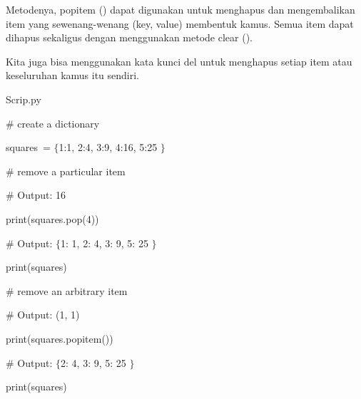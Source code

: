 Metodenya, popitem () dapat digunakan untuk menghapus dan mengembalikan item yang sewenang-wenang (key, value) membentuk kamus. Semua item dapat dihapus sekaligus dengan menggunakan metode clear (). \par
\noindent 
Kita juga bisa menggunakan kata kunci del untuk menghapus setiap item atau keseluruhan kamus itu sendiri. \par
\vspace{12pt}
\noindent 
Scrip.py \par
\vspace{12pt}
\noindent 
 \hspace*{0.5in}  $  \#  $ create a dictionary \par
\noindent 
 \hspace*{0.5in} squares~=  $  \{  $1:1, 2:4, 3:9, 4:16, 5:25 $  \}  $   \par
\vspace{12pt}
\noindent 
 \hspace*{0.5in}  $  \#  $ remove a particular item \par
\noindent 
 \hspace*{0.5in}  $  \#  $ Output: 16 \par
\noindent 
 \hspace*{0.5in} print(squares.pop(4))~  \par
\vspace{12pt}
\noindent 
 \hspace*{0.5in}  $  \#  $ Output:  $  \{  $1: 1, 2: 4, 3: 9, 5: 25 $  \}  $ \par
\noindent 
 \hspace*{0.5in} print(squares) \par
\vspace{12pt}
\noindent 
 \hspace*{0.5in}  $  \#  $ remove an arbitrary item \par
\noindent 
 \hspace*{0.5in}  $  \#  $ Output: (1, 1) \par
\noindent 
 \hspace*{0.5in} print(squares.popitem()) \par
\vspace{12pt}
\noindent 
 \hspace*{0.5in}  $  \#  $ Output:  $  \{  $2: 4, 3: 9, 5: 25 $  \}  $ \par
\noindent 
 \hspace*{0.5in} print(squares) \par
\vspace{12pt}
